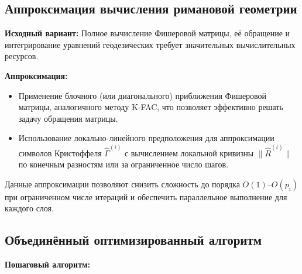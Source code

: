 \documentclass[a4paper,12pt]{article}
\begin{document}
\subsection*{Аппроксимация вычисления римановой геометрии}

\textbf{Исходный вариант:} Полное вычисление Фишеровой матрицы, её обращение и интегрирование уравнений геодезических требует значительных вычислительных ресурсов.

\textbf{Аппроксимация:}
\begin{itemize}
\item Применение блочного (или диагонального) приближения Фишеровой матрицы, аналогичного методу K-FAC, что позволяет эффективно решать задачу обращения матрицы.
\item Использование локально-линейного предположения для аппроксимации символов Кристоффеля \(\hat{\Gamma}^{(i)}\) с вычислением локальной кривизны \(\| \hat{R}^{(i)} \|\) по конечным разностям или за ограниченное число шагов.
\end{itemize}
Данные аппроксимации позволяют снизить сложность до порядка \( O(1) \)–\( O(p_i) \) при ограниченном числе итераций и обеспечить параллельное выполнение для каждого слоя.

\subsection*{Объединённый оптимизированный алгоритм}

\textbf{Пошаговый алгоритм:}
\end{document}
